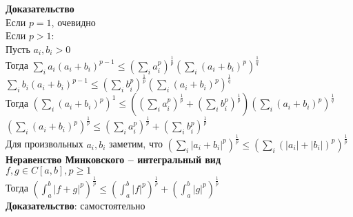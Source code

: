 \documentclass[12pt]{article}
\begin{document}
\textbf{Доказательство}\\
Если $p = 1$, очевидно\\
Если $p > 1$:\\
Пусть $a_i, b_i > 0$\\
Тогда $\sum_i a_i (a_i + b_i)^{p-1} \leq (\sum_i a_i^p)^{\frac1p}(\sum_i (a_i + b_i)^p)^{\frac1q}$\\
$\sum_i b_i (a_i + b_i)^{p-1} \leq (\sum_i b_i^p)^{\frac1p}(\sum_i (a_i + b_i)^p)^{\frac1q}$\\
Тогда $(\sum_i (a_i+b_i)^p)^1 \leq ((\sum_i a_i^p)^{\frac1p} + (\sum_i b_i^p)^{\frac1p})(\sum_i (a_i + b_i)^p)^{\frac1q}$\\
$(\sum_i (a_i+b_i)^p)^{\frac1p} \leq (\sum_i a_i^p)^{\frac1p} + (\sum_i b_i^p)^{\frac1p}$\\
Для произвольных $a_i, b_i$ заметим, что $(\sum_i |a_i+b_i|^p)^{\frac1p} \leq (\sum_i (|a_i|+|b_i|)^p)^{\frac1p}$\\
\textbf{Неравенство Минковского -- интегральный вид}\\
$f,g \in C[a,b], p\geq 1$\\
Тогда $(\int_a^b |f+g|^p)^{\frac1p} \leq (\int_a^b |f|^p)^{\frac1p} + (\int_a^b |g|^p)^{\frac1p}$\\
\textbf{Доказательство}: самостоятельно
\end{document}
